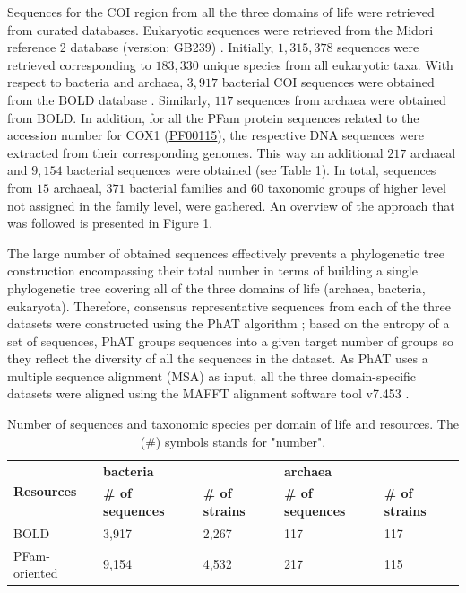    Sequences for the COI region from all the three domains of life were retrieved from curated databases. 
   Eukaryotic sequences were retrieved from the Midori reference 2 database (version: GB239) \citep{machida2017metazoan}. 
   Initially, $1,315,378$ sequences were retrieved corresponding to $183,330$ unique species from all eukaryotic taxa. 
   With respect to bacteria and archaea, $3,917$ bacterial COI sequences were obtained from the BOLD database \citep{ratnasingham2007bold}. 
   Similarly, $117$ sequences from archaea were obtained from BOLD. 
   In addition, for all the PFam protein sequences related to the accession number for 
   COX1 (\href{http://www.ncbi.nlm.nih.gov/nuccore/PF00115}{PF00115}), the respective DNA sequences were extracted from their corresponding genomes. 
   This way an additional $217$ archaeal and $9,154$ bacterial sequences were obtained (see Table 1). 
   In total, sequences from $15$ archaeal, $371$ bacterial families and 60 taxonomic groups of higher level not assigned in the family level, were gathered. 
   An overview of the approach that was followed is presented in Figure 1. 

   The large number of obtained sequences effectively prevents a phylogenetic tree construction encompassing their total number in terms of building a single phylogenetic tree covering all of the three domains of life (archaea, bacteria, eukaryota). 
   Therefore, consensus representative sequences from each of the three datasets were constructed using 
   the PhAT algorithm \citep{czech2019methods}; 
   based on the entropy of a set of sequences, PhAT groups sequences into a given target number of groups so they reflect the diversity of all the sequences in the dataset. 
   As PhAT uses a multiple sequence alignment (MSA) as input, all the three domain-specific datasets were aligned using the MAFFT alignment software tool v7.453 \citep{katoh2002mafft, nakamura2018parallelization}.
   
   \begin{table}[h]
      \begin{tabular}{@{}lllll@{}}
      \toprule
      \multirow{2}{*}{\textbf{Resources}} & \multicolumn{2}{l}{\textbf{bacteria}} & \multicolumn{2}{l}{\textbf{archaea}} \\ \cmidrule(l){2-5} 
      & \textbf{\# of sequences} & \textbf{\# of strains} & \textbf{\# of sequences} & \textbf{\# of strains} \\ \cmidrule(r){1-1}
      BOLD & 3,917 & 2,267 & 117 & 117 \\
      PFam-oriented & 9,154 & 4,532 & 217 & 115 \\ \bottomrule
      \end{tabular}
      \caption{Number of sequences and taxonomic species per domain of life and resources. The (\#) symbols stands for "number".}
   \end{table}


